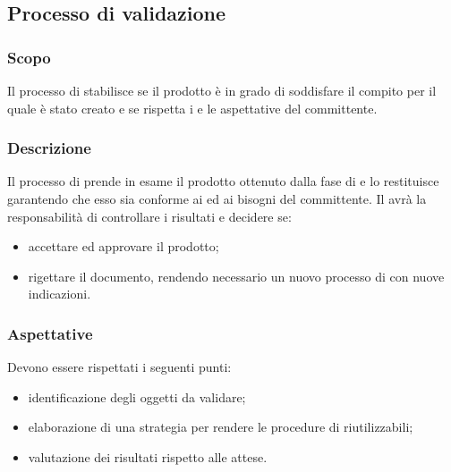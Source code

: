 \subsection{Processo di validazione}
\subsubsection{Scopo}
Il processo di  stabilisce se il prodotto è in grado di soddisfare il compito per il quale è stato creato e se rispetta i  e le aspettative del committente.
\subsubsection{Descrizione}
Il processo di  prende in esame il prodotto ottenuto dalla fase di  e lo restituisce garantendo che esso sia conforme ai  ed ai bisogni del committente.
Il \RdP{} avrà la responsabilità di controllare i risultati e decidere se:
\begin{itemize}
	\item accettare ed approvare il prodotto;
	\item rigettare il documento, rendendo necessario un nuovo processo di  con nuove indicazioni.
\end{itemize}
\subsubsection{Aspettative}
Devono essere rispettati i seguenti punti:
\begin{itemize}
	\item identificazione degli oggetti da validare;
	\item elaborazione di una strategia per rendere le procedure di  riutilizzabili;
	\item valutazione dei risultati rispetto alle attese.
\end{itemize}

